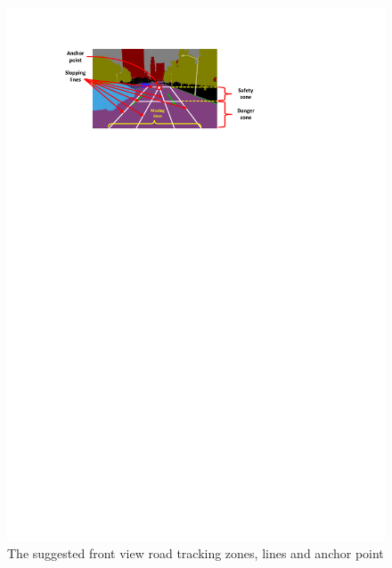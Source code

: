 \documentclass{svproc}
\begin{document}
\begin{figure}[!t]
	\centering
	\includegraphics[scale=.83,trim=3cm 22.5cm 7.1cm 2cm,clip]{segmentation_regions2.pdf}
	\caption{The suggested front view road tracking zones, lines and anchor point}
	\label{Fig:segmentation_regions1}
\end{figure}
\end{document}
